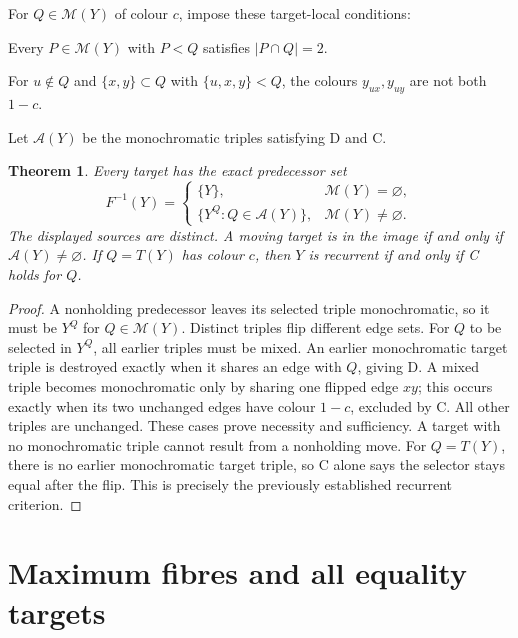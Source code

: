 \documentclass[a4paper,10pt]{amsart}
\newtheorem{theorem}{Theorem}[section]
\theoremstyle{remark}
\newcommand{\M}{\mathcal M}
\newcommand{\A}{\mathcal A}
\begin{document}
For $Q\in\M(Y)$ of colour $c$, impose these target-local conditions:
\begin{description}[leftmargin=2em,labelwidth=1.6em]
\item[D.] Every $P\in\M(Y)$ with $P<Q$ satisfies $|P\cap Q|=2$.
\item[C.] For $u\notin Q$ and $\{x,y\}\subset Q$ with
$\{u,x,y\}<Q$, the colours $y_{ux},y_{uy}$ are not both $1-c$.
\end{description}
Let $\A(Y)$ be the monochromatic triples satisfying D and C.

\begin{theorem}\label{thm:inverse}
Every target has the exact predecessor set
\[
F^{-1}(Y)=\begin{cases}
\{Y\},&\M(Y)=\varnothing,\\
\{Y^Q:Q\in\A(Y)\},&\M(Y)\ne\varnothing.
\end{cases}
\]
The displayed sources are distinct. A moving target is in the image if
and only if $\A(Y)\ne\varnothing$. If $Q=T(Y)$ has colour $c$, then
$Y$ is recurrent if and only if C holds for $Q$.
\end{theorem}
\begin{proof}
A nonholding predecessor leaves its selected triple monochromatic, so
it must be $Y^Q$ for $Q\in\M(Y)$. Distinct triples flip different edge
sets. For $Q$ to be selected in $Y^Q$, all earlier triples must be mixed.
An earlier monochromatic target triple is destroyed exactly when it
shares an edge with $Q$, giving D. A mixed triple becomes monochromatic
only by sharing one flipped edge $xy$; this occurs exactly when its two
unchanged edges have colour $1-c$, excluded by C. All other triples are
unchanged. These cases prove necessity and sufficiency. A target with no
monochromatic triple cannot result from a nonholding move.
For $Q=T(Y)$, there is no earlier monochromatic target triple, so C
alone says the selector stays equal after the flip. This is precisely
the previously established recurrent criterion.
\end{proof}

\section{Maximum fibres and all equality targets}
\end{document}
